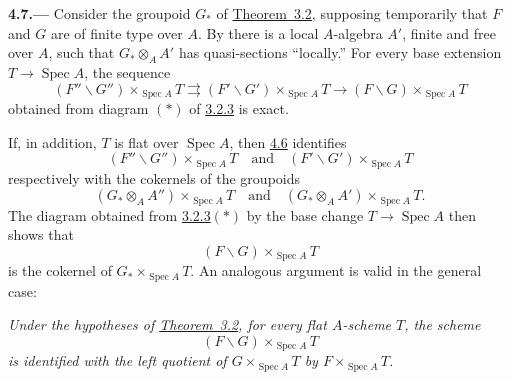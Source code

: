 
\medskip
{}\label{par:sga3-VIA-4.7}%
\noindent\textbf{4.7.---}
Consider the groupoid \(G_*\) of \hyperref[thm:sga3-VIA-3.2]{Theorem~3.2}, supposing temporarily
that \(F\) and \(G\) are of finite type over \(A\). By  there
is a local \(A\)-algebra \(A'\), finite and free over \(A\), such
that \(G_*\otimes_AA'\) has quasi-sections ``locally.'' For every
base extension \(T\to\operatorname{Spec}A\), the sequence
\[
  (F''\backslash G'')\times_{\operatorname{Spec}A}T
    \rightrightarrows
  (F'\backslash G')\times_{\operatorname{Spec}A}T
    \longrightarrow
  (F\backslash G)\times_{\operatorname{Spec}A}T
\]
obtained from diagram \((*)\) of \hyperref[diag:sga3-VIA-3.2.3-exact-descent]{3.2.3} is exact.

If, in addition, \(T\) is flat over \(\operatorname{Spec}A\), then
\hyperref[par:sga3-VIA-4.6]{4.6} identifies
\[
  (F''\backslash G'')\times_{\operatorname{Spec}A}T
  \quad\text{and}\quad
  (F'\backslash G')\times_{\operatorname{Spec}A}T
\]
respectively with the cokernels of the groupoids
\[
  (G_*\otimes_AA'')\times_{\operatorname{Spec}A}T
  \quad\text{and}\quad
  (G_*\otimes_AA')\times_{\operatorname{Spec}A}T.
\]
The diagram obtained from \hyperref[diag:sga3-VIA-3.2.3-exact-descent]{3.2.3}\((*)\) by the base change
\(T\to\operatorname{Spec}A\) then shows that
\[
  (F\backslash G)\times_{\operatorname{Spec}A}T
\]
is the cokernel of
\(G_*\times_{\operatorname{Spec}A}T\). An analogous argument is valid in
the general case:

\medskip
\textit{Under the hypotheses of \hyperref[thm:sga3-VIA-3.2]{Theorem~3.2}, for every flat
\(A\)-scheme \(T\), the scheme
\[
  (F\backslash G)\times_{\operatorname{Spec}A}T
\]
is identified with the left quotient of
\(G\times_{\operatorname{Spec}A}T\) by
\(F\times_{\operatorname{Spec}A}T\).}%
